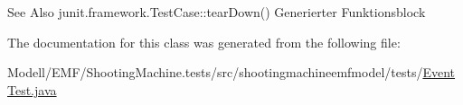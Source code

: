 \begin{DoxySeeAlso}{See Also}
junit.\-framework.\-Test\-Case\-::tear\-Down() Generierter Funktionsblock 
\end{DoxySeeAlso}


The documentation for this class was generated from the following file\-:\begin{DoxyCompactItemize}
\item 
Modell/\-E\-M\-F/\-Shooting\-Machine.\-tests/src/shootingmachineemfmodel/tests/\hyperlink{_event_test_8java}{Event\-Test.\-java}\end{DoxyCompactItemize}
